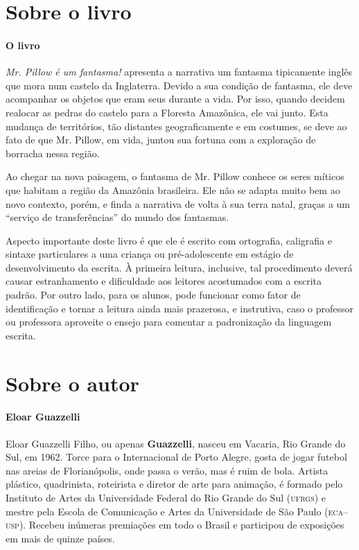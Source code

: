 \documentclass[11pt]{extarticle}
\begin{document}
\section{Sobre o livro}

\paragraph{O livro} \textit{Mr. Pillow é um fantasma!} apresenta a narrativa um fantasma tipicamente inglês 
que mora num castelo da Inglaterra. Devido a sua condição de fantasma, ele deve acompanhar
os objetos que eram seus durante a vida. Por isso, quando decidem realocar as pedras do castelo para 
a Floresta Amazônica, ele vai junto. Esta mudança de territórios, tão distantes geograficamente
e em costumes, se deve ao fato de que Mr. Pillow, em vida, juntou sua fortuna com a exploração de borracha
nessa região.

Ao chegar na nova paisagem, o fantasma de Mr. Pillow conhece os seres míticos que habitam a região da Amazônia
brasileira. Ele não se adapta muito bem ao novo contexto, porém, e finda a narrativa de volta à sua
terra natal, graças a um ``serviço de transferências'' do mundo dos fantasmas. 

Aspecto importante deste livro é que ele é escrito com ortografia, caligrafia e sintaxe 
particulares a uma criança ou pré-adolescente em estágio de desenvolvimento da 
escrita. À primeira leitura, inclusive, tal procedimento deverá causar estranhamento 
e dificuldade aos leitores acostumados com a escrita padrão. Por outro lado,
para os alunos, pode funcionar como fator de identificação e tornar a leitura
ainda mais prazerosa, e instrutiva, caso o professor ou professora aproveite o
ensejo para comentar a padronização da linguagem escrita. 



\section{Sobre o autor}

\paragraph{Eloar Guazzelli}


Eloar Guazzelli Filho, ou apenas \textbf{Guazzelli}, nasceu em Vacaria, Rio Grande do Sul, em 1962. 
Torce para o Internacional de Porto Alegre, gosta de jogar futebol nas areias de Florianópolis, onde passa o verão, mas é ruim de bola. Artista plástico, quadrinista, roteirista e diretor de arte para animação, é formado pelo Instituto de Artes da Universidade Federal do Rio Grande do Sul (\textsc{ufrgs}) e mestre pela Escola de Comunicação e Artes da Universidade de São Paulo (\textsc{eca--usp}). Recebeu inúmeras premiações em todo o Brasil e participou de exposições em mais de quinze países.
\end{document}
